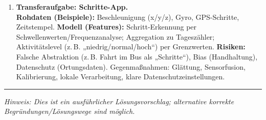 \documentclass[11pt,a4paper]{scrartcl}
\begin{document}
\begin{enumerate}[leftmargin=*,label=\textbf{Aufgabe~\arabic*:}, itemsep=0.9em, start=1]
		\item \textbf{Transferaufgabe: Schritte-App.}\\
		\textbf{Rohdaten (Beispiele):} Beschleunigung (x/y/z), Gyro, GPS-Schritte, Zeitstempel.  
		\textbf{Modell (Features):} Schritt-Erkennung per Schwellenwerten/Frequenzanalyse; Aggregation zu Tageszähler; Aktivitätslevel (z.\,B. „niedrig/normal/hoch“) per Grenzwerten.  
		\textbf{Risiken:} Falsche Abstraktion (z.\,B. Fahrt im Bus als „Schritte“), Bias (Handhaltung), Datenschutz (Ortungsdaten). Gegenmaßnahmen: Glättung, Sensorfusion, Kalibrierung, lokale Verarbeitung, klare Datenschutzeinstellungen.
	\end{enumerate}
	
	\vfill
	\hrule
	\small\emph{Hinweis: Dies ist ein ausführlicher Lösungsvorschlag; alternative korrekte Begründungen/Lösungswege sind möglich.}
	
\end{document}
